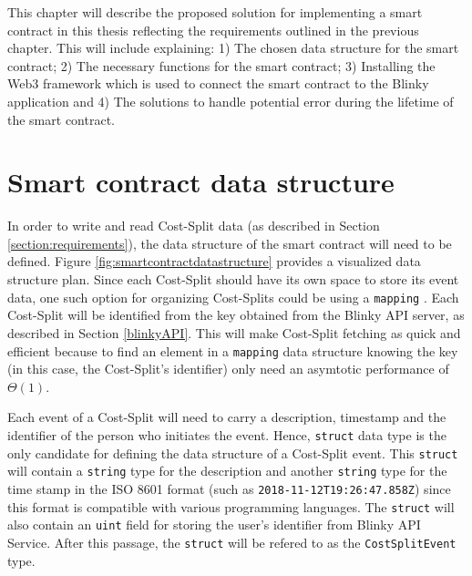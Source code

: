 \documentclass[twoside,numperchapter]{tutthesis} %
\begin{document}
This chapter will describe the proposed solution for implementing a smart contract in this thesis reflecting the requirements outlined in the previous chapter. This will include explaining: 1) The chosen data structure for the smart contract; 2) The necessary functions for the smart contract; 3) Installing the Web3 framework which is used to connect the smart contract to the Blinky application and 4) The solutions to handle potential error during the lifetime of the smart contract.

\section{Smart contract data structure}
\label{section:DataStructure}

In order to write and read Cost-Split data (as described in Section \ref{section:requirements}), the data structure of the smart contract will need to be defined. Figure \ref{fig:smartcontractdatastructure} provides a visualized data structure plan. Since each Cost-Split should have its own space to store its event data, one such option for organizing Cost-Splits could be using a \texttt{mapping} \citep{SolidityMapping}. Each Cost-Split will be identified from the key obtained from the Blinky API server, as described in Section \ref{blinkyAPI}. This will make Cost-Split fetching as quick and efficient because to find an element in a \texttt{mapping} data structure knowing the key (in this case, the Cost-Split's identifier) only need an asymtotic performance of $\Theta(1)$. 

Each event of a Cost-Split will need to carry a description, timestamp and the identifier of the person who initiates the event. Hence, \texttt{struct} data type is the only candidate for defining the data structure of a Cost-Split event. This \texttt{struct} will contain a \texttt{string} type for the description and another \texttt{string} type for the time stamp in the ISO 8601 format \citep{ISOFormat} (such as \texttt{2018-11-12T19:26:47.858Z}) since this format is compatible with various programming languages. The \texttt{struct} will also contain an \texttt{uint} field for storing the user's identifier from Blinky API Service. After this passage, the \texttt{struct} will be refered to as the \texttt{CostSplitEvent} type.
\label{DataStructure}
\end{document}
